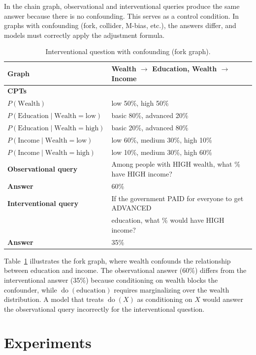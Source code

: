 \documentclass[11pt,a4paper]{article}
\begin{document}
In the chain graph, observational and interventional queries produce the same answer because there is no confounding. This serves as a control condition. In graphs with confounding (fork, collider, M-bias, etc.), the answers differ, and models must correctly apply the adjustment formula.

\begin{table}[h]
\centering
\caption{Interventional question with confounding (fork graph).}
\label{tab:ex-fork}
\begin{tabular}{ll}
\toprule
\textbf{Graph} & Wealth $\rightarrow$ Education, Wealth $\rightarrow$ Income \\
\midrule
\textbf{CPTs} & \\
$P(\text{Wealth})$ & low 50\%, high 50\% \\
$P(\text{Education} \mid \text{Wealth}=\text{low})$ & basic 80\%, advanced 20\% \\
$P(\text{Education} \mid \text{Wealth}=\text{high})$ & basic 20\%, advanced 80\% \\
$P(\text{Income} \mid \text{Wealth}=\text{low})$ & low 60\%, medium 30\%, high 10\% \\
$P(\text{Income} \mid \text{Wealth}=\text{high})$ & low 10\%, medium 30\%, high 60\% \\
\midrule
\textbf{Observational query} & Among people with HIGH wealth, what \% have HIGH income? \\
\textbf{Answer} & 60\% \\
\midrule
\textbf{Interventional query} & If the government PAID for everyone to get ADVANCED \\ & education, what \% would have HIGH income? \\
\textbf{Answer} & 35\% \\
\bottomrule
\end{tabular}
\end{table}

Table~\ref{tab:ex-fork} illustrates the fork graph, where wealth confounds the relationship between education and income. The observational answer (60\%) differs from the interventional answer (35\%) because conditioning on wealth blocks the confounder, while $\operatorname{do}(\text{education})$ requires marginalizing over the wealth distribution. A model that treats $\operatorname{do}(X)$ as conditioning on $X$ would answer the observational query incorrectly for the interventional question.

\section{Experiments}
\end{document}
